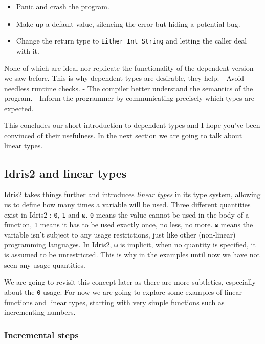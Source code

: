 \documentclass[
]{article}
\providecommand{\tightlist}{%
  \setlength{\itemsep}{0pt}\setlength{\parskip}{0pt}}
\begin{document}
\begin{itemize}
\tightlist
\item
  Panic and crash the program.
\item
  Make up a default value, silencing the error but hiding a potential
  bug.
\item
  Change the return type to \texttt{Either\ Int\ String} and letting the
  caller deal with it.
\end{itemize}

None of which are ideal nor replicate the functionality of the dependent
version we saw before. This is why dependent types are desirable, they
help: - Avoid needless runtime checks. - The compiler better understand
the semantics of the program. - Inform the programmer by communicating
precisely which types are expected.

This concludes our short introduction to dependent types and I hope
you've been convinced of their usefulness. In the next section we are
going to talk about linear types.

\hypertarget{idris2-and-linear-types}{%
\subsection{Idris2 and linear types}\label{idris2-and-linear-types}}

Idris2 takes things further and introduces \emph{linear types} in its
type system, allowing us to define how many times a variable will be
used. Three different quantities exist in Idris2 : \texttt{0},
\texttt{1} and \texttt{ω}. \texttt{0} means the value cannot be used in
the body of a function, \texttt{1} means it has to be used exactly once,
no less, no more. \texttt{ω} means the variable isn't subject to any
usage restrictions, just like other (non-linear) programming languages.
In Idris2, \texttt{ω} is implicit, when no quantity is specified, it is
assumed to be unrestricted. This is why in the examples until now we
have not seen any usage quantities.

We are going to revisit this concept later as there are more subtleties,
especially about the \texttt{0} usage. For now we are going to explore
some examples of linear functions and linear types, starting with very
simple functions such as incrementing numbers.

\hypertarget{incremental-steps}{%
\subsubsection{Incremental steps}\label{incremental-steps}}
\end{document}
